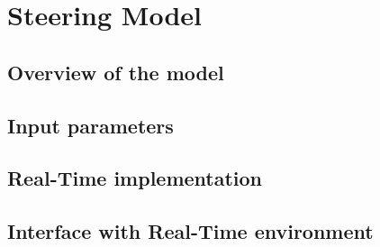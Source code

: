 \documentclass[ExampleMasters.tex]{subfiles}
\begin{document}
\clearpage
\chapter{Steering Model}
\label{chap:steering_model}

\section{Overview of the model}
\label{sec:overview_of_the_model}
			

\section{Input parameters}
\label{sec:input_parameters}
\section{Real-Time implementation}
\label{sec:real_time_implementation}
\section{Interface with Real-Time environment}
\label{sec:interface_with_real_time}
\end{document}
